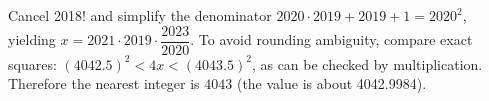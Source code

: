 Cancel 2018! and simplify the denominator $2020\cdot2019+2019+1=2020^2$, yielding $x=2021\cdot2019\cdot\dfrac{2023}{2020}$. To avoid rounding ambiguity, compare exact squares: $(4042.5)^2<4x<(4043.5)^2$, as can be checked by multiplication. Therefore the nearest integer is $\boxed{4043}$ (the value is about 4042.9984).
